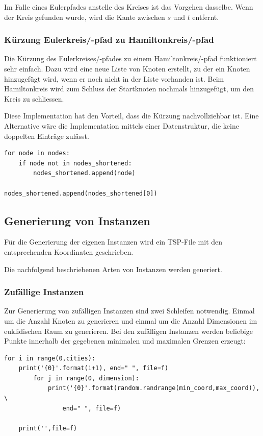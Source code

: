 \documentclass[11pt,a4paper]{article}
\begin{document}
\begin{flushleft}
   Im Falle eines Eulerpfades anstelle des Kreises ist das Vorgehen dasselbe. Wenn der Kreis gefunden wurde, wird die Kante zwischen $s$ und $t$ entfernt.
\end{flushleft}

\subsubsection{Kürzung Eulerkreis/-pfad zu Hamiltonkreis/-pfad}
Die Kürzung des Eulerkreises/-pfades zu einem Hamiltonkreis/-pfad funktioniert sehr einfach. Dazu wird eine neue Liste von Knoten erstellt, zu der ein Knoten hinzugefügt wird, wenn er noch nicht in der Liste vorhanden ist. Beim Hamiltonkreis wird zum Schluss der Startknoten nochmals hinzugefügt, um den Kreis zu schliessen. 

Diese Implementation hat den Vorteil, dass die Kürzung nachvollziehbar ist. Eine Alternative wäre die Implementation mittels einer Datenstruktur, die keine doppelten Einträge zulässt.

\begin{verbatim}
for node in nodes:
    if node not in nodes_shortened:
        nodes_shortened.append(node)

nodes_shortened.append(nodes_shortened[0])
\end{verbatim}

\subsection{Generierung von Instanzen}
Für die Generierung der eigenen Instanzen wird ein TSP-File mit den entsprechenden Koordinaten geschrieben.

Die nachfolgend beschriebenen Arten von Instanzen werden generiert.

\subsubsection{Zufällige Instanzen}
Zur Generierung von zufälligen Instanzen sind zwei Schleifen notwendig. Einmal um die Anzahl Knoten zu generieren und einmal um die Anzahl Dimensionen im euklidischen Raum zu generieren. Bei den zufälligen Instanzen werden beliebige Punkte innerhalb der gegebenen minimalen und maximalen Grenzen erzeugt:

\begin{verbatim}
for i in range(0,cities):
    print('{0}'.format(i+1), end=" ", file=f)
        for j in range(0, dimension):
            print('{0}'.format(random.randrange(min_coord,max_coord)), \
                end=" ", file=f)

    print('',file=f)
\end{verbatim}
\end{document}
